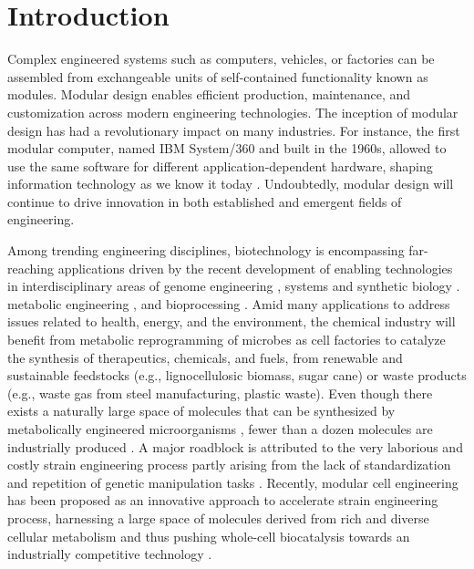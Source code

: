 

\section{Introduction}

Complex engineered systems such as computers, vehicles, or factories can be assembled from exchangeable units of self-contained functionality known as modules.
Modular design enables efficient production, maintenance, and customization across modern engineering technologies.
The inception of modular design has had a revolutionary impact on many industries.
For instance, the first modular computer, named IBM System/360 and built in the 1960s, allowed to use the same software for different application-dependent hardware, shaping information technology as we know it today \citep{o2018}.
Undoubtedly, modular design will continue to drive innovation in both established and emergent fields of engineering.

Among trending engineering disciplines, biotechnology is encompassing far-reaching applications driven by the recent development of enabling technologies in interdisciplinary areas of genome engineering \citep{barrangou2016}, systems and synthetic biology \citep{kahl2013}.
metabolic engineering \citep{nielsen2016}, and bioprocessing \citep{cramer2011, olson2012}.
Amid many applications to address issues related to health, energy, and the environment, the chemical industry will benefit from metabolic reprogramming of microbes as cell factories to catalyze the synthesis of therapeutics, chemicals, and fuels, from renewable and sustainable feedstocks (e.g., lignocellulosic biomass, sugar cane) or waste products (e.g., waste gas from steel manufacturing, plastic waste).
Even though there exists a naturally large space of molecules that can be synthesized by metabolically engineered microorganisms \citep{lee2019}, fewer than a dozen molecules are industrially produced \citep{nielsen2016}.
A major roadblock is attributed to the very laborious and costly strain engineering process partly arising from the lack of standardization and repetition of genetic manipulation tasks \citep{king2017, winkler2015}.
Recently, modular cell engineering has been proposed as an innovative approach to accelerate strain engineering process, harnessing a large space of molecules derived from rich and diverse cellular metabolism and thus pushing whole-cell biocatalysis towards an industrially competitive technology \citep{trinh2016}.

